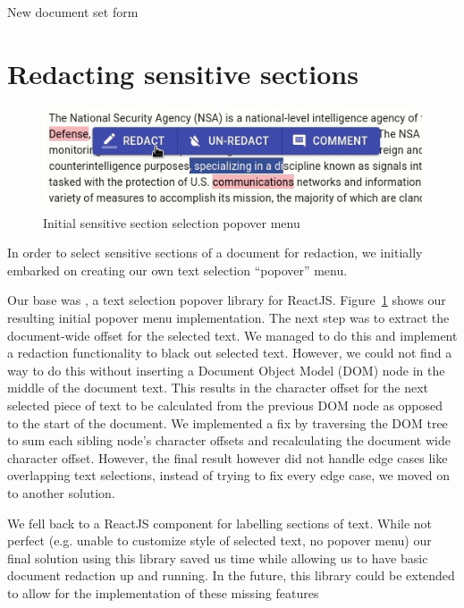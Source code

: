 \documentclass[\version]{l4proj}
\begin{document}
\begin{listing}[H]
    \inputminted{jsx}{code/newSetForm.jsx}
    \caption{New document set form}\label{listing:newSetForm}
\end{listing}

\section{Redacting sensitive sections}

\begin{figure}
    \includegraphics[width=\linewidth]{images/popover_menu_1.jpg}
    \caption{Initial sensitive section selection popover menu}\label{fig:popover_1}
    \vspace{-10pt}
\end{figure}

In order to select sensitive sections of a document for redaction, we initially embarked on creating our own text selection ``popover'' menu.

Our base was \textcite{krispel-samselJuliankrispelReacttextselectionpopover2020}, a text selection popover library for ReactJS.
Figure~\ref{fig:popover_1} shows our resulting initial popover menu implementation.
The next step was to extract the document-wide offset for the selected text.
We managed to do this and implement a redaction functionality to black out selected text.
However, we could not find a way to do this without inserting a Document Object Model (DOM) node in the middle of the document text.
This results in the character offset for the next selected piece of text to be calculated from the previous DOM node as opposed to the start of the document.
We implemented a fix by traversing the DOM tree to sum each sibling node's character offsets and recalculating the document wide character offset.
However, the final result however did not handle edge cases like overlapping text selections, instead of trying to fix every edge case, we moved on to another solution.

We fell back to \textcite{camachoMcamacReacttextannotate2020} a ReactJS component for labelling sections of text.
While not perfect (e.g. unable to customize style of selected text, no popover menu) our final solution using this library saved us time while allowing us to have basic document redaction up and running.
In the future, this library could be extended to allow for the implementation of these missing features
\end{document}
